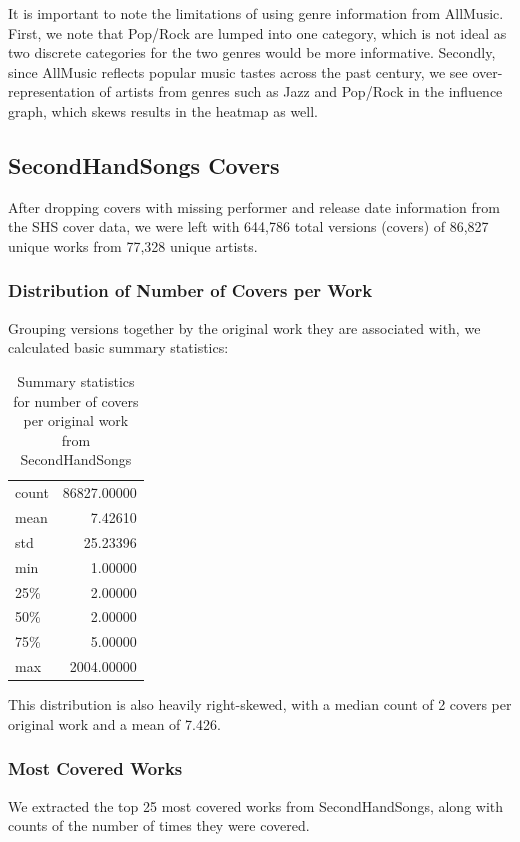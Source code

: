 It is important to note the limitations of using genre information from AllMusic. First, we note that Pop/Rock are lumped into one category, which is not ideal as two discrete categories for the two genres would be more informative. Secondly, since AllMusic reflects popular music tastes across the past century, we see over-representation of artists from genres such as Jazz and Pop/Rock in the influence graph, which skews results in the heatmap as well.

\subsection{SecondHandSongs Covers}
After dropping covers with missing performer and release date information from the SHS cover data, we were left with 644,786 total versions (covers) of 86,827 unique works from 77,328 unique artists.

\subsubsection*{Distribution of Number of Covers per Work}
Grouping versions together by the original work they are associated with, we calculated basic summary statistics:

\begin{table}[H]
\centering
\caption{Summary statistics for number of covers per original work from SecondHandSongs}
\label{my-label}
\begin{tabular}{lr}
count &  86827.00000 \\
mean  &      7.42610 \\
std   &     25.23396 \\
min   &      1.00000 \\
25\%   &      2.00000 \\
50\%   &      2.00000 \\
75\%   &      5.00000 \\
max   &   2004.00000 \\
\end{tabular}
\end{table}

This distribution is also heavily right-skewed, with a median count of 2 covers per original work and a mean of 7.426.

\subsubsection*{Most Covered Works}
We extracted the top 25 most covered works from SecondHandSongs, along with counts of the number of times they were covered.

